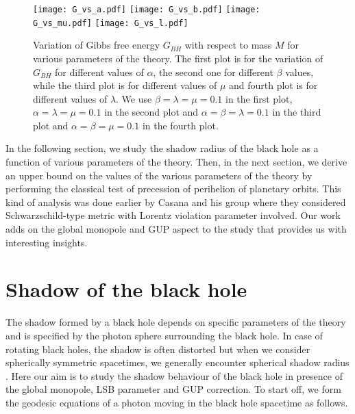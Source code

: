 \documentclass[aps,amsmath,amssymb,showpacs,showkeys]{revtex4}
\begin{document}
\begin{figure}[h!]
\texttt{[image: G\_vs\_a.pdf]}\hspace{0.5cm}
\texttt{[image: G\_vs\_b.pdf]}\vspace{0.2cm}
\texttt{[image: G\_vs\_mu.pdf]}\hspace{0.5cm}
\texttt{[image: G\_vs\_l.pdf]}
\caption{ Variation of Gibbs free energy $G_{BH}$ with respect to mass $M$
for various parameters of the theory. The first plot is for the variation of
$G_{BH}$ for different values of $\alpha$, the second one for different $\beta$ values, while the third plot is for different values of $\mu$ and fourth 
plot is for different values of $\lambda$. We use
$\beta = \lambda = \mu = 0.1$ in the first plot, 
$\alpha = \lambda = \mu = 0.1$ in the second plot and 
$\alpha = \beta = \lambda = 0.1$ in the third plot and 
$\alpha = \beta = \mu = 0.1$ in the fourth plot.}
\label{Fig04}
\end{figure} 

In the following section, we study the shadow radius of the black 
hole as a function of various parameters of the theory.
Then, in the next section, we derive an upper bound on the values of the 
various parameters of the theory by performing the classical test of 
precession of perihelion of planetary orbits. This kind of analysis was done 
earlier by Casana and his group \cite{17} where they considered 
Schwarzschild-type metric with Lorentz violation parameter involved. Our 
work adds on the global monopole and GUP aspect to the study that provides us 
with interesting insights.

\section{Shadow of the black hole}
\label{sec4}
The shadow formed by a black hole depends on specific parameters of the 
theory and is specified by the photon sphere surrounding the black hole. In 
case of rotating black holes, the shadow is often distorted but 
when we consider spherically symmetric spacetimes, we generally encounter 
spherical shadow radius \cite{1s}. Here our aim is to study the shadow behaviour 
of the black hole in presence of the global monopole, LSB parameter and GUP 
correction. To start off, we form the geodesic equations of a photon moving in 
the black hole spacetime as follows.
\end{document}
